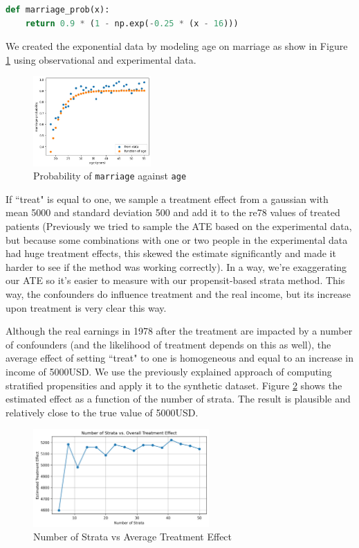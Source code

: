 \documentclass[12pt]{article}
\begin{document}
\begin{lstlisting}[language=Python, caption=Marriage using exponential saturation]
def marriage_prob(x):
    return 0.9 * (1 - np.exp(-0.25 * (x - 16)))
\end{lstlisting}

We created the exponential data by modeling age on marriage as show in Figure \ref{fig:exp_marriage} using observational and experimental data.

\begin{figure}[ht]
\centering
\includegraphics[width=0.4\textwidth]{img/exp_marr.jpeg}
\caption{Probability of {\tt marriage} against {\tt age}}
\label{fig:exp_marriage}
\end{figure}

If ``treat" is equal to one, we sample a treatment effect from a gaussian with mean 5000 and standard deviation 500 and add it to the re78 values of treated patients (Previously we tried to sample the ATE based on the experimental data, but because some combinations with one or two people in the experimental data had huge treatment effects, this skewed the estimate significantly and made it harder to see if the method was working correctly). In a way, we're exaggerating our ATE so it's easier to measure with our propensit-based strata method. This way, the confounders do influence treatment and the real income, but its increase upon treatment is very clear this way.

Although the real earnings in 1978 after the treatment are impacted by a number of confounders (and the likelihood of treatment depends on this as well), the average effect of setting ``treat" to one is homogeneous and equal to an increase in income of 5000USD. We use the previously explained approach of computing stratified propensities and apply it to the synthetic dataset. Figure \ref{fig:strata} shows the estimated effect as a function of the number of strata. The result is plausible and relatively close to the true value of 5000USD.

\begin{figure}[ht]
\centering
\includegraphics[width=0.6\textwidth]{img/ate_strata.jpeg}
\caption{Number of Strata vs Average Treatment Effect}
\label{fig:strata}
\end{figure}
\end{document}
